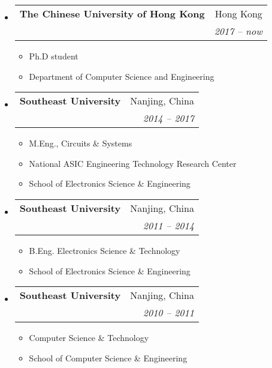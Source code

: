 \documentclass[letterpaper,11pt]{article}%
\makeatletter
\newlength{\outerbordwidth}
\newcommand{\resitem}[1]{\item #1 \vspace{-2pt}}
\newcommand{\resheading}[1]{\vspace{8pt}
  \parbox{\textwidth}{\setlength{\FrameSep}{\outerbordwidth}
    \begin{shaded}

\setlength{\fboxsep}{0pt}\framebox[\textwidth][l]{\setlength{\fboxsep}{4pt}\fcolorbox{shadecolorB}{shadecolorB}{\textbf{\sffamily{\mbox{~}\makebox[6.762in][l]{\large #1} \vphantom{p\^{E}}}}}}
    \end{shaded}
  }\vspace{-5pt}
}
\newcommand{\ressubheading}[4]{
\begin{tabular*}{6.5in}{l@{\cftdotfill{\cftsecdotsep}\extracolsep{\fill}}r}
		\textbf{#1} & #2 \\
		\textit{#3} & \textit{#4} \\
\end{tabular*}\vspace{-6pt}}
\makeatother
\begin{document}
\begin{itemize}

\item
	\ressubheading{The Chinese University of Hong Kong}{Hong Kong}{}{2017 -- now}
	\begin{itemize}
		\resitem{Ph.D student}
		\resitem{Department of Computer Science and Engineering}
	\end{itemize}


\item
	\ressubheading{Southeast University}{Nanjing, China}{}{2014 -- 2017}
	\begin{itemize}
		\resitem{M.Eng., Circuits \& Systems}
		\resitem{National ASIC Engineering Technology Research Center}
		\resitem{School of Electronics Science \& Engineering}
	\end{itemize}

\item
	\ressubheading{Southeast University}{Nanjing, China}{}{2011 -- 2014}
	\begin{itemize}
		\resitem{B.Eng. Electronics Science \& Technology}
		\resitem{School of Electronics Science \& Engineering}
	\end{itemize}

\item
	\ressubheading{Southeast University}{Nanjing, China}{}{2010 --  2011}
	\begin{itemize}
		\resitem{Computer Science \& Technology}
		\resitem{School of Computer Science \& Engineering}
	\end{itemize}

\end{itemize}





\end{document}
